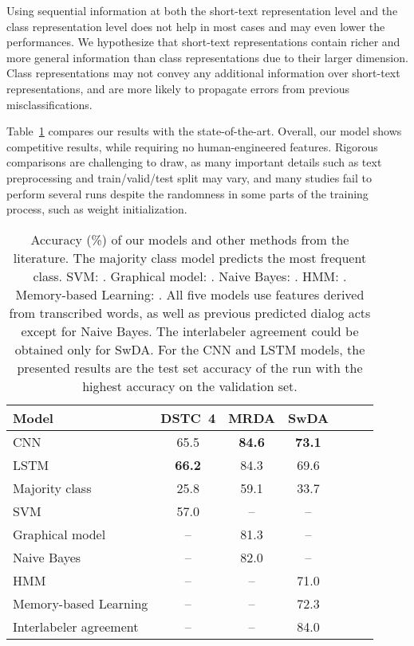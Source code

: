 \documentclass[11pt,letterpaper]{article}
\begin{document}
Using sequential information at both the short-text representation level and the class representation level does not help in most cases and may even lower the performances.
We hypothesize that short-text representations contain richer and more general information than class representations due to their larger dimension. Class representations may not convey any additional information over short-text representations, and are more likely to propagate errors from previous misclassifications. 


				
Table~\ref{tab:result-comparisons} compares our results with the state-of-the-art. 
Overall, our model shows competitive results, while requiring no human-engineered features.
Rigorous comparisons are challenging to draw, as many important details such as text preprocessing and train/valid/test split may vary, and many studies fail to perform several runs despite the randomness in some parts of the training process, such as weight initialization.









\vspace{-0.1cm}
\begin{table} [H]
\footnotesize
\centering
\setlength{\extrarowheight}{3pt}
\setlength{\arraycolsep}{5pt}
\begin{tabular}{|l|c|c|c|c|c|c|}
\hline
\textbf{Model} & DSTC~4 	& MRDA 	& SwDA\\
\hline
CNN			& 65.5			&	\textbf{84.6}	& \textbf{73.1} \\ 
LSTM		& \textbf{66.2}			&	84.3	& 69.6 \\ 
Majority class		& 25.8			&	59.1	& 33.7 \\
SVM		& 57.0		&	 --		& --	\\
Graphical model	& --		&	 81.3		& --	\\
Naive Bayes & --			&	 82.0		& --	\\
HMM & --			&	 --		& 71.0	\\
Memory-based Learning & --			&	 --		& 72.3	\\
Interlabeler agreement & --			&	 --		& 84.0	\\
\hline
\end{tabular}
\caption{Accuracy (\%) of our models and other methods from the literature. 
The majority class model predicts the most frequent class. 
SVM: \protect\cite{dernoncourt2016adobe}.
Graphical model: \protect\cite{ji2006backoff}.
Naive Bayes: \protect\cite{lendvai2007token}.
HMM: \protect\cite{stolcke2000dialogue}.
Memory-based Learning: \protect\cite{rotaru2002dialog}. 
All five models use features derived from transcribed words, as well as previous predicted dialog acts except for Naive Bayes.
The interlabeler agreement could be obtained only for SwDA.
For the CNN and LSTM models, the presented results are the test set accuracy of the run with the highest accuracy on the validation set.\vspace{-0.1cm}
} \label{tab:result-comparisons}
\end{table}
\end{document}
